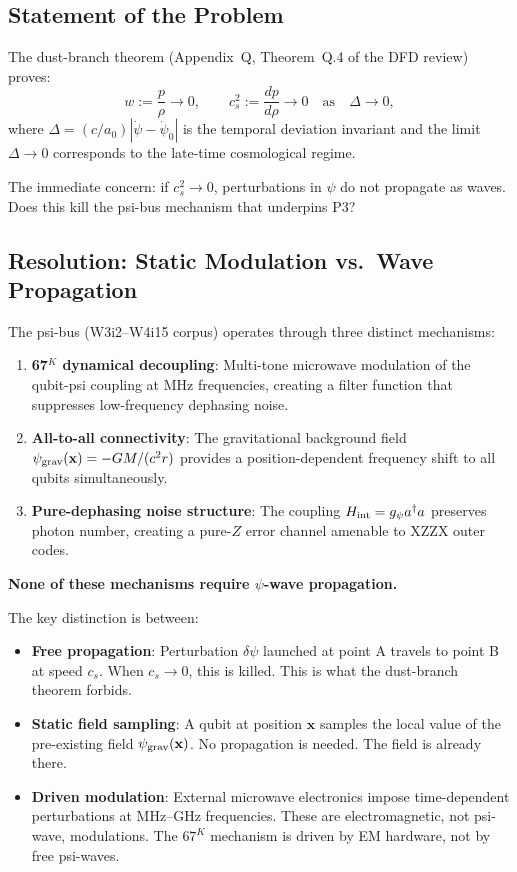 \documentclass[11pt]{article}
\theoremstyle{definition}
\theoremstyle{remark}
\newcommand{\psigrav}{\psi_{\rm grav}}
\begin{document}
\subsection{Statement of the Problem}

The dust-branch theorem (Appendix~Q, Theorem~Q.4 of the DFD review) proves:
\begin{equation}
  w := \frac{p}{\rho} \to 0, \qquad c_s^2 := \frac{dp}{d\rho} \to 0
  \quad \text{as} \quad \Delta \to 0,
  \label{eq:dust-branch}
\end{equation}
where $\Delta = (c/a_0)|\dot\psi - \dot\psi_0|$ is the temporal deviation
invariant and the limit $\Delta \to 0$ corresponds to the late-time
cosmological regime.

The immediate concern: if $c_s^2 \to 0$, perturbations in $\psi$ do not
propagate as waves.  Does this kill the psi-bus mechanism that underpins P3?

\subsection{Resolution: Static Modulation vs.\ Wave Propagation}

The psi-bus (W3i2--W4i15 corpus) operates through three distinct mechanisms:
\begin{enumerate}
  \item \textbf{67$^K$ dynamical decoupling}: Multi-tone microwave modulation
    of the qubit-psi coupling at MHz frequencies, creating a filter function
    that suppresses low-frequency dephasing noise.
  \item \textbf{All-to-all connectivity}: The gravitational background field
    $\psigrav(\mathbf{x}) = -GM/(c^2 r)$ provides a position-dependent
    frequency shift to all qubits simultaneously.
  \item \textbf{Pure-dephasing noise structure}: The coupling $H_{\rm int}
    = g_\psi a^\dagger a$ preserves photon number, creating a pure-$Z$
    error channel amenable to XZZX outer codes.
\end{enumerate}

\textbf{None of these mechanisms require $\psi$-wave propagation.}

The key distinction is between:
\begin{itemize}
  \item \textbf{Free propagation}: Perturbation $\delta\psi$ launched at point
    A travels to point B at speed $c_s$.  When $c_s \to 0$, this is killed.
    This is what the dust-branch theorem forbids.
  \item \textbf{Static field sampling}: A qubit at position $\mathbf{x}$
    samples the local value of the pre-existing field $\psigrav(\mathbf{x})$.
    No propagation is needed.  The field is already there.
  \item \textbf{Driven modulation}: External microwave electronics impose
    time-dependent perturbations at MHz--GHz frequencies.  These are
    electromagnetic, not psi-wave, modulations.  The $67^K$ mechanism
    is driven by EM hardware, not by free psi-waves.
\end{itemize}
\end{document}
